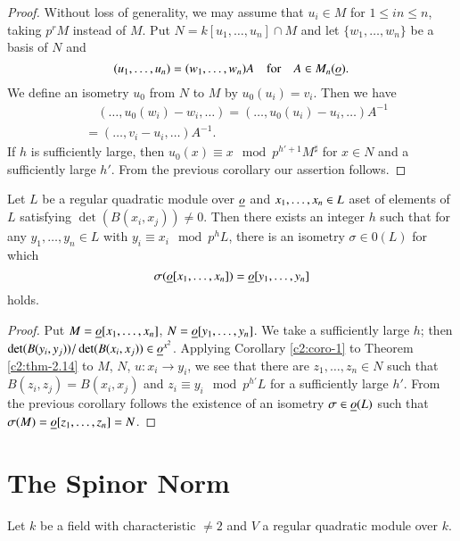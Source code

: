 \begin{proof}
Without loss of generality, we may assume that $u_{i}\in M$ for $1\leq
in\leq n$, taking $p^{r}M$ instead of $M$. Put
$N=k[u_{1},\ldots,u_{n}]\cap M$ and let $\{w_{1},\ldots,w_{n}\}$ be a
basis of $N$ and
$$
(u_{1},\ldots,u_{n})=(w_{1},\ldots,w_{n})A\quad\text{for}\quad A\in
M_{n}(\underline{o}). 
$$
We define an isometry $u_{0}$ from $N$ to $M$ by
$u_{0}(u_{i})=v_{i}$. Then we have
\begin{align*}
&\quad
  (\ldots,u_{0}(w_{i})-w_{i},\ldots)=(\ldots,u_{0}(u_{i})-u_{i},\ldots)A^{-1}\\
& = (\ldots,v_{i}-u_{i},\ldots)A^{-1}.
\end{align*}
If $h$ is sufficiently large, then $u_{0}(x)\equiv x\mod
p^{h'+1}M^{\sharp}$ for $x\in N$ and a sufficiently large $h'$. From
the previous corollary our assertion follows.
\end{proof}

\begin{cor}\label{c2:coro-4}
Let $L$ be a regular quadratic module over $\underline{o}$ and
$x_{1},\ldots,\break x_{n}\in L$ a\pageoriginale set of elements of $L$
satisfying $\det(B(x_{i},x_{j}))\neq 0$. Then there exists an integer
$h$ such that for any $y_{1},\ldots,y_{n}\in L$ with $y_{i}\equiv
x_{i}\mod p^{h}L$, there is an isometry $\sigma\in 0(L)$ for which
$$
\sigma(\underline{o}[x_{1},\ldots,x_{n}])=\underline{o}[y_{1},\ldots,y_{n}]
$$
holds.
\end{cor}

\begin{proof}
Put $M=\underline{o}[x_{1},\ldots,x_{n}]$, $N=\underline{o}[y_{1},\ldots,y_{n}]$. We
take a sufficiently large $h$; then $\det (B(y_{i},y_{j}))/\det
(B(x_{i},x_{j}))\in \underline{o}^{x^{2}}$. Applying Corollary \ref{c2:coro-1}
to Theorem \ref{c2:thm-2.14} to $M$, $N$, $u:x_{i}\to y_{i}$, we see that
there are $z_{1},\ldots,z_{n}\in N$ such that
$B(z_{i},z_{j})=B(x_{i},x_{j})$ and $z_{i}\equiv y_{i}\mod p^{h'}L$
for a sufficiently large $h'$. From the previous corollary follows the
existence of an isometry $\sigma\in \underline{o}(L)$ such that
$\sigma(M)=\underline{o}[z_{1},\ldots,z_{n}]=N$. 
\end{proof}

\section{The Spinor Norm}\label{c2:sec2.2}

Let $k$ be a field with characteristic $\neq 2$ and $V$ a regular
quadratic module over $k$.

